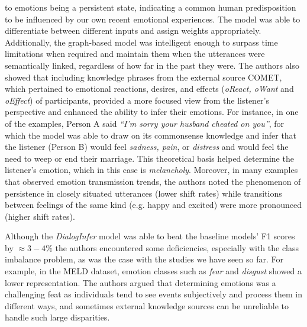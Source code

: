 to emotions being a persistent state, indicating a common human predisposition to be influenced by our own recent emotional experiences. The model was able to differentiate between different inputs and assign weights appropriately. Additionally, the graph-based model was intelligent enough to surpass time limitations when required and maintain them when the utterances were semantically linked, regardless of how far in the past they were. The authors also showed that including knowledge phrases from the external source COMET, which pertained to emotional reactions, desires, and effects (\textit{oReact, oWant} and \textit{oEffect}) of participants, provided a more focused view from the listener's perspective and enhanced the ability to infer their emotions. For instance, in one of the examples, Person A said \textit{``I'm sorry your husband cheated on you''}, for which the model was able to draw on its commonsense knowledge and infer that the listener (Person B) would feel \textit{sadness, pain}, or \textit{distress} and would feel the need to weep or end their marriage. This theoretical basis helped determine the listener's emotion, which in this case is \textit{melancholy}. Moreover, in many examples that observed emotion transmission trends, the authors noted the phenomenon of persistence in closely situated utterances (lower shift rates) while transitions between feelings of the same kind (e.g. happy and excited) were more pronounced (higher shift rates).

Although the \textit{DialogInfer} model was able to beat the baseline models' F1 scores by $\approx 3-4\%$ the authors encountered some deficiencies, especially with the class imbalance problem, as was  the case with the studies we have seen so far. For example, in the MELD dataset, emotion classes such as \textit{fear} and \textit{disgust} showed a lower representation. The authors argued that determining emotions was a challenging feat as individuals tend to see events subjectively and process them in different ways, and sometimes external knowledge sources can be unreliable to handle such large disparities.





